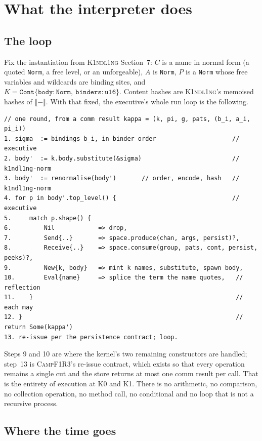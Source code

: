 \documentclass[11pt,a4paper]{article}
\newcommand{\code}[1]{\texttt{#1}}
\newcommand{\Kind}{\textsc{K1ndl1ng}}
\newcommand{\Camp}{\textsc{CampF1R3}}
\newcommand{\enc}[1]{\llbracket #1 \rrbracket}
\newcommand{\Norm}{\code{Norm}}
\theoremstyle{definition}
\theoremstyle{plain}
\begin{document}
\section{What the interpreter does}\label{sec:work}

\subsection{The loop}

Fix the instantiation from \Kind{} Section~7: $C$ is a name in normal form
(a quoted \Norm, a free level, or an unforgeable), $A$ is \Norm, $P$ is a
\Norm{} whose free variables and wildcards are binding sites, and
$K=\code{Cont}\{\code{body}:\Norm,\ \code{binders}:\code{u16}\}$. Content hashes
are \Kind's memoised hashes of $\enc{-}$. With that fixed, the executive's whole
run loop is the following.

\begin{lstlisting}
// one round, from a comm result kappa = (k, pi, g, pats, (b_i, a_i, pi_i))
1. sigma  := bindings b_i, in binder order                     // executive
2. body'  := k.body.substitute(&sigma)                         // k1ndl1ng-norm
3. body'  := renormalise(body')       // order, encode, hash   // k1ndl1ng-norm
4. for p in body'.top_level() {                                // executive
5.     match p.shape() {
6.         Nil            => drop,
7.         Send{..}       => space.produce(chan, args, persist)?,
8.         Receive{..}    => space.consume(group, pats, cont, persist, peeks)?,
9.         New{k, body}   => mint k names, substitute, spawn body,
10.        Eval{name}     => splice the term the name quotes,   // reflection
11.    }                                                        // each may
12. }                                                           // return Some(kappa')
13. re-issue per the persistence contract; loop.
\end{lstlisting}

\noindent
Steps 9 and 10 are where the kernel's two remaining constructors are handled;
step~13 is \Camp's re-issue contract, which exists so that every operation
remains a single cut and the store returns at most one comm result per call.
That is the entirety of execution at K0 and K1. There is no arithmetic, no
comparison, no collection operation, no method call, no conditional and no
loop that is not a recursive process.

\subsection{Where the time goes}
\end{document}

